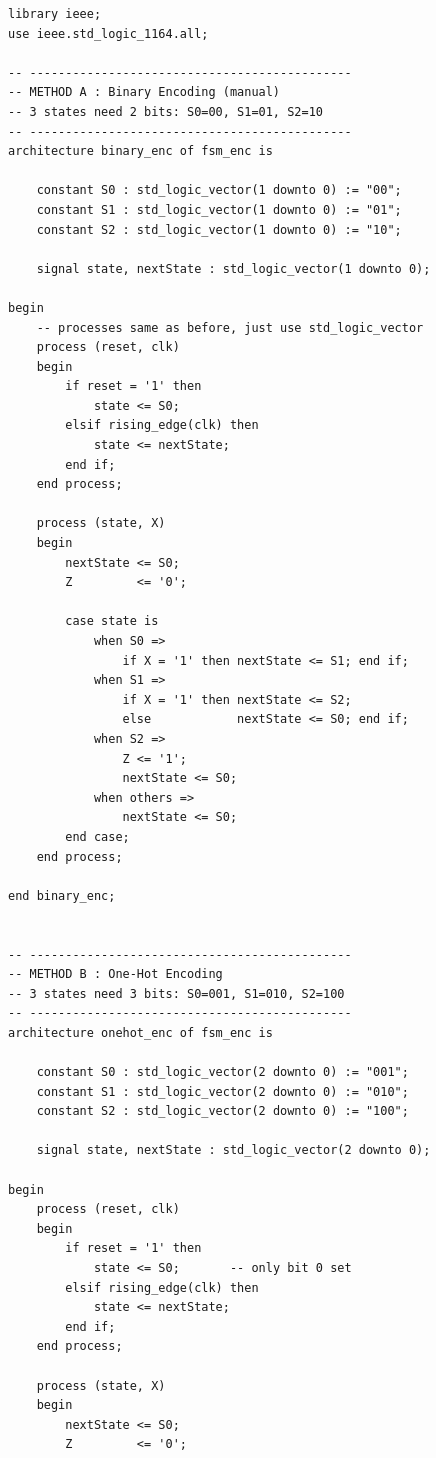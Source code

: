 \documentclass[12pt,a4paper]{article}
\begin{document}
\begin{tcolorbox}[vhdlbox, title={Level 5 --- state\_encoding.vhd}]
\begin{lstlisting}[style=vhdlstyle]
library ieee;
use ieee.std_logic_1164.all;

-- ---------------------------------------------
-- METHOD A : Binary Encoding (manual)
-- 3 states need 2 bits: S0=00, S1=01, S2=10
-- ---------------------------------------------
architecture binary_enc of fsm_enc is

    constant S0 : std_logic_vector(1 downto 0) := "00";
    constant S1 : std_logic_vector(1 downto 0) := "01";
    constant S2 : std_logic_vector(1 downto 0) := "10";

    signal state, nextState : std_logic_vector(1 downto 0);

begin
    -- processes same as before, just use std_logic_vector
    process (reset, clk)
    begin
        if reset = '1' then
            state <= S0;
        elsif rising_edge(clk) then
            state <= nextState;
        end if;
    end process;

    process (state, X)
    begin
        nextState <= S0;
        Z         <= '0';

        case state is
            when S0 =>
                if X = '1' then nextState <= S1; end if;
            when S1 =>
                if X = '1' then nextState <= S2;
                else            nextState <= S0; end if;
            when S2 =>
                Z <= '1';
                nextState <= S0;
            when others =>
                nextState <= S0;
        end case;
    end process;

end binary_enc;


-- ---------------------------------------------
-- METHOD B : One-Hot Encoding
-- 3 states need 3 bits: S0=001, S1=010, S2=100
-- ---------------------------------------------
architecture onehot_enc of fsm_enc is

    constant S0 : std_logic_vector(2 downto 0) := "001";
    constant S1 : std_logic_vector(2 downto 0) := "010";
    constant S2 : std_logic_vector(2 downto 0) := "100";

    signal state, nextState : std_logic_vector(2 downto 0);

begin
    process (reset, clk)
    begin
        if reset = '1' then
            state <= S0;       -- only bit 0 set
        elsif rising_edge(clk) then
            state <= nextState;
        end if;
    end process;

    process (state, X)
    begin
        nextState <= S0;
        Z         <= '0';


\end{lstlisting}
\end{tcolorbox}
\end{document}
